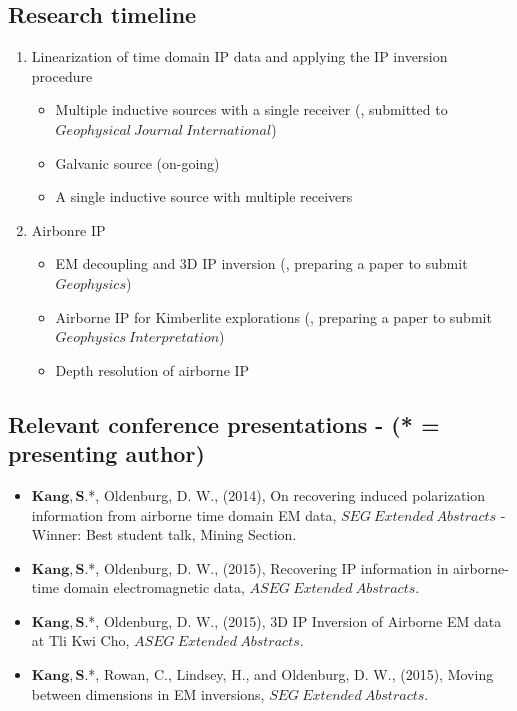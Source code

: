 \documentclass[letterpaper,11pt]{article}
\begin{document}
\subsection{Research timeline}
\begin{enumerate}
  \item Linearization of time domain IP data and applying the IP inversion procedure
  \begin{itemize}
    \item Multiple inductive sources with a single receiver (\cite{Kang2015c}, submitted to $\mathit Geophysical \ Journal \ International$)
    \item Galvanic source (on-going)
    \item A single inductive source with multiple receivers 
  \end{itemize}
  \item Airbonre IP
  \begin{itemize}
    \item EM decoupling and 3D IP inversion (\cite{Kang2015a}, preparing a paper to submit $\mathit Geophysics$)
    \item Airborne IP for Kimberlite explorations (\cite{Kang2015b}, preparing a paper to submit $\mathit Geophysics \ Interpretation$)
    \item Depth resolution of airborne IP
  \end{itemize}  
\end{enumerate}
\subsection{Relevant conference presentations - (* = presenting author)}
\begin{itemize}
\item
$\mathbf{Kang, S.}$*, Oldenburg, D. W., (2014), On recovering induced polarization information from airborne time domain EM data, $SEG \ Extended \ Abstracts$ - Winner: Best student talk, Mining Section.
\item
$\mathbf{Kang, S.}$*, Oldenburg, D. W., (2015), Recovering IP information in airborne-time domain electromagnetic data, $ASEG \ Extended \ Abstracts$.
\item
$\mathbf{Kang, S.}$*, Oldenburg, D. W., (2015), 3D IP Inversion of Airborne EM data at Tli Kwi Cho, $ASEG \ Extended \ Abstracts$.
\item
$\mathbf{Kang, S.}$*, Rowan, C., Lindsey, H., and Oldenburg, D. W., (2015), Moving between dimensions in EM inversions, $SEG \ Extended \ Abstracts$.
\end{itemize}
\end{document}
